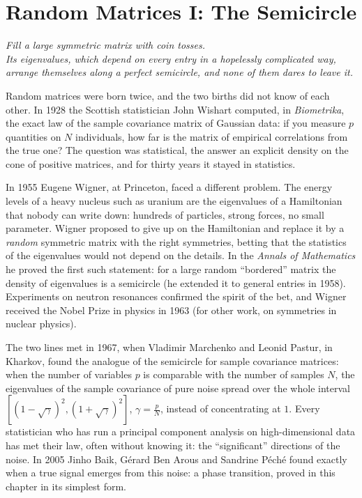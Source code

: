 \chapter{Random Matrices I: The Semicircle}

\begin{center}\itshape
Fill a large symmetric matrix with coin tosses.\\
Its eigenvalues, which depend on every entry in a hopelessly complicated way,\\
arrange themselves along a perfect semicircle, and none of them dares to leave it.
\end{center}

Random matrices were born twice, and the two births did not know of each other. In 1928 the Scottish statistician John Wishart computed, in \emph{Biometrika}, the exact law of the sample covariance matrix of Gaussian data:
if you measure $p$ quantities on $N$ individuals, how far is the matrix of empirical correlations from the true one? The question was statistical, the answer an explicit density on the cone of positive matrices,
and for thirty years it stayed in statistics.

In 1955 Eugene Wigner, at Princeton, faced a different problem. The energy levels of a heavy nucleus such as uranium are the eigenvalues of a Hamiltonian that nobody can write down: hundreds of particles,
strong forces, no small parameter. Wigner proposed to give up on the Hamiltonian and replace it by a \emph{random} symmetric matrix with the right symmetries, betting that the statistics of the eigenvalues
would not depend on the details. In the \emph{Annals of Mathematics} he proved the first such statement: for a large random ``bordered'' matrix the density of eigenvalues is a semicircle (he extended it to general
entries in 1958). Experiments on neutron resonances confirmed the spirit of the bet, and Wigner received the Nobel Prize in physics in 1963 (for other work, on symmetries in nuclear physics).

The two lines met in 1967, when Vladimir Marchenko and Leonid Pastur, in Kharkov, found the analogue of the semicircle for sample covariance matrices: when the number of variables $p$ is comparable with the
number of samples $N$, the eigenvalues of the sample covariance of pure noise spread over the whole interval $[(1-\sqrt\gamma)^2,(1+\sqrt\gamma)^2]$, $\gamma=\frac pN$, instead of concentrating at $1$. Every statistician who has
run a principal component analysis on high-dimensional data has met their law, often without knowing it: the ``significant'' directions of the noise. In 2005 Jinho Baik, G\'erard Ben Arous and Sandrine P\'ech\'e found
exactly when a true signal emerges from this noise: a phase transition, proved in this chapter in its simplest form.

